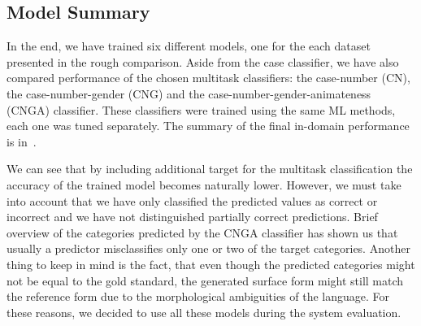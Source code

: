 
\subsection{Model Summary}

In the end, we have trained six different models, one for the each dataset presented in the rough comparison.
Aside from the case classifier, we have also compared performance of the chosen multitask classifiers:
the case-number (CN), the case-number-gender (CNG) and the case-number-gender-animateness (CNGA)
classifier. These classifiers were trained using the same ML methods, each one was tuned separately.
The summary of the final in-domain performance is in~.

We can see that by including additional target for the multitask classification the accuracy of the trained
model becomes naturally lower. However, we must take into account that we have only classified the predicted
values as correct or incorrect and we have not distinguished partially correct predictions. Brief overview
of the categories predicted by the CNGA classifier has shown us that usually a predictor misclassifies only
one or two of the target categories. Another thing to keep in mind is the fact, that even though the predicted
categories might not be equal to the gold standard, the generated surface form might still match the reference form
due to the morphological ambiguities of the language. For these reasons, we decided to use all these models during the system evaluation.


